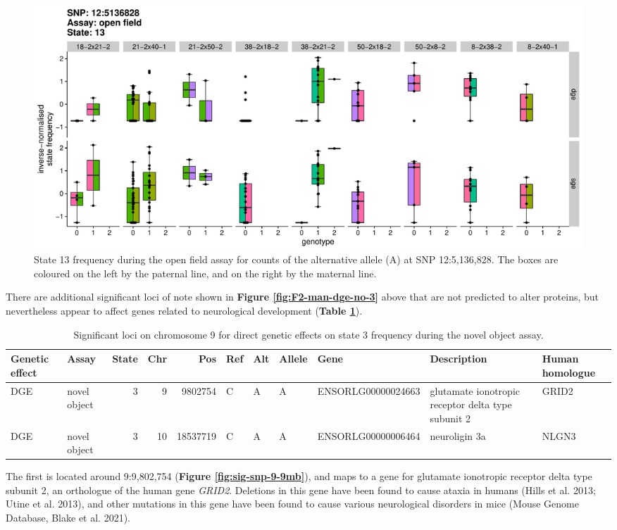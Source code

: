 \documentclass[
]{book}
\begin{document}
\begin{figure}
\includegraphics[width=1\linewidth]{figs/mikk_behaviour/sig_snps_boxplots/13-12:5136828} \caption{State 13 frequency during the open field assay for counts of the alternative allele (A) at SNP 12:5,136,828. The boxes are coloured on the left by the paternal line, and on the right by the maternal line.}\label{fig:sig-snp-12-5mb}
\end{figure}

There are additional significant loci of note shown in \textbf{Figure \ref{fig:F2-man-dge-no-3}} above that are not predicted to alter proteins, but nevertheless appear to affect genes related to neurological development (\textbf{Table \ref{tab:tbl-sig-snp-chr-9-10}}).

\begin{table}

\caption{\label{tab:tbl-sig-snp-chr-9-10}Significant loci on chromosome 9 for direct genetic effects on state 3 frequency during the novel object assay.}
\centering
\begin{tabular}[t]{l|l|r|r|r|l|l|l|l|l|l}
\hline
Genetic effect & Assay & State & Chr & Pos & Ref & Alt & Allele & Gene & Description & Human homologue\\
\hline
DGE & novel object & 3 & 9 & 9802754 & C & A & A & ENSORLG00000024663 & glutamate ionotropic receptor delta type subunit 2 & GRID2\\
\hline
DGE & novel object & 3 & 10 & 18537719 & C & A & A & ENSORLG00000006464 & neuroligin 3a & NLGN3\\
\hline
\end{tabular}
\end{table}

The first is located around 9:9,802,754 (\textbf{Figure \ref{fig:sig-snp-9-9mb}}), and maps to a gene for glutamate ionotropic receptor delta type subunit 2, an orthologue of the human gene \emph{GRID2}. Deletions in this gene have been found to cause ataxia in humans (Hills et al. 2013; Utine et al. 2013), and other mutations in this gene have been found to cause various neurological disorders in mice (Mouse Genome Database, Blake et al. 2021).
\end{document}
